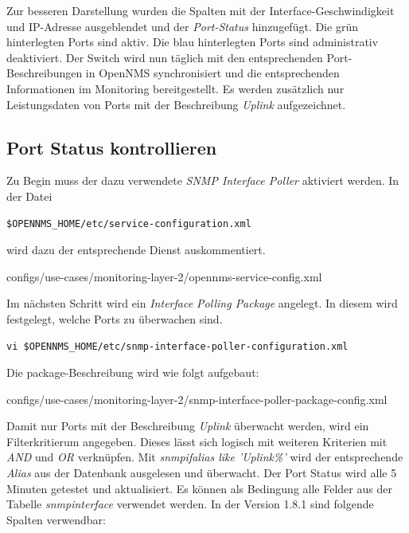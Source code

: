 Zur besseren Darstellung wurden die Spalten mit der Interface-Geschwindigkeit und IP-Adresse ausgeblendet und der \emph{Port-Status} hinzugefügt. Die grün hinterlegten Ports sind aktiv. Die blau hinterlegten Ports sind administrativ deaktiviert. Der Switch wird nun täglich  mit den entsprechenden Port-Beschreibungen in OpenNMS synchronisiert und die entsprechenden Informationen im Monitoring bereitgestellt. Es werden zusätzlich nur Leistungsdaten von Ports mit der Beschreibung \emph{Uplink} aufgezeichnet.

\subsection{Port Status kontrollieren}
Zu Begin muss der dazu verwendete \emph{SNMP Interface Poller} aktiviert werden. In der Datei

\begin{lstlisting}[numbers=none]
$OPENNMS_HOME/etc/service-configuration.xml
\end{lstlisting}

wird dazu der entsprechende Dienst auskommentiert.


  {configs/use-cases/monitoring-layer-2/opennms-service-config.xml}

Im nächsten Schritt wird ein \emph{Interface Polling Package} angelegt. In diesem wird festgelegt, welche Ports zu überwachen sind.

\begin{lstlisting}[numbers=none]
vi $OPENNMS_HOME/etc/snmp-interface-poller-configuration.xml
\end{lstlisting}

Die package-Beschreibung wird wie folgt aufgebaut:


  {configs/use-cases/monitoring-layer-2/snmp-interface-poller-package-config.xml}

Damit nur Ports mit der Beschreibung \emph{Uplink} überwacht werden, wird ein Filterkritierum angegeben. Dieses lässt sich logisch mit weiteren Kriterien mit \emph{AND} und \emph{OR} verknüpfen. Mit \emph{snmpifalias like 'Uplink\%'} wird der entsprechende \emph{Alias} aus der Datenbank ausgelesen und überwacht. Der Port Status wird alle 5 Minuten getestet und aktualisiert. Es können als Bedingung alle Felder aus der Tabelle \emph{snmpinterface} verwendet werden. In der Version 1.8.1 sind folgende Spalten verwendbar:

